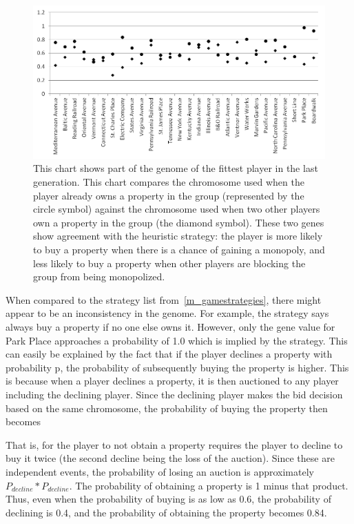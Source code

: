 \begin{figure}[htp]
\centerline{\includegraphics[width=1.0\columnwidth]{Figures/genome.png}}
\caption[Illustration of Genome]{This chart shows part of the genome of the
fittest player in the last generation. This chart compares the chromosome used
when the player already owns a property in the group (represented by the circle
symbol) against the chromosome used when two other players own a property in the
group (the diamond symbol). These two genes show agreement with the heuristic
strategy: the player is more likely to buy a property when there is a chance of
gaining a monopoly, and less likely to buy a property when other players are
blocking the group from being monopolized.}
\label{figure-genome}
\end{figure}

When compared to the strategy list from~\ref{m_gamestrategies}, there might
appear to be an inconsistency in the genome. For example, the strategy says
always buy a property if no one else owns it. However, only the gene value for
Park Place approaches a probability of 1.0 which is implied by the strategy.
This can easily be explained by the fact that if the player declines a property
with probability p, the probability of subsequently buying the property is
higher. This is because when a player declines a property, it is then auctioned
to any player including the declining player. Since the declining player makes
the bid decision based on the same chromosome, the probability of buying the
property then becomes

That is, for the player to not obtain a property requires the player to decline
to buy it twice (the second decline being the loss of the auction). Since these
are independent events, the probability of losing an auction is approximately
\(P_{decline} * P_{decline}\). The probability of obtaining a property is 1
minus that product. Thus, even when the probability of buying is as low as 0.6, the
probability of declining is 0.4, and the probability of obtaining the property
becomes 0.84.

